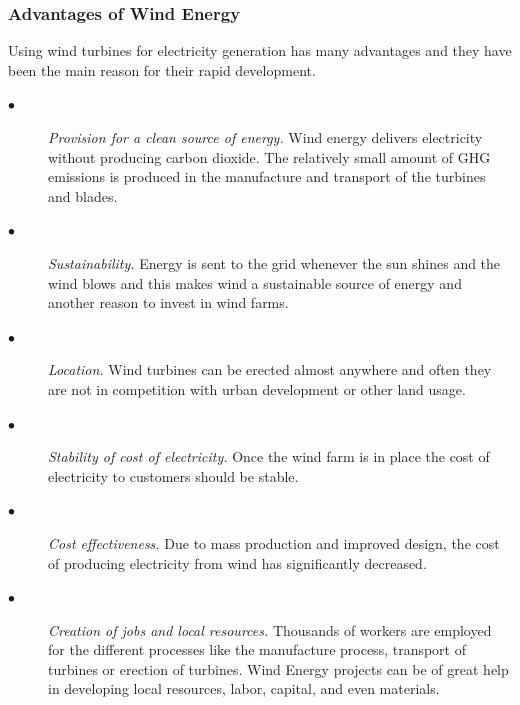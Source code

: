 \documentclass[twosided,a4,10pt]{article}
\begin{document}
\begin{multicols}{2}
 \subsubsection{Advantages of Wind Energy}
 Using wind turbines for electricity generation has many advantages and they have been the main reason for their rapid development.
 \begin{description}
 	\item[$\bullet$]
 	 \textit{Provision for a clean source of energy.} Wind energy delivers electricity without producing carbon dioxide. The relatively small amount of GHG emissions is produced in the manufacture and transport of the turbines and blades.
 	\item[$\bullet$] \textit{Sustainability.} Energy is sent to the grid whenever the sun shines and the wind blows and this makes wind a sustainable source of energy and another reason to invest in wind farms.
 	\item[$\bullet$] \textit{Location.} Wind turbines can be erected almost anywhere and often they are not in competition with urban development or other land usage.
 	\item[$\bullet$]
 	\textit{Stability of cost of electricity.} Once the wind farm is in place the cost of electricity to customers should be stable.
 	\item[$\bullet$]
 	\textit{Cost effectiveness.} Due to mass production and improved design, the cost of producing electricity from wind has significantly decreased.
 	\item[$\bullet$]
 	\textit{Creation of jobs and local resources.} Thousands of workers are employed for the different processes like the manufacture process, transport of turbines or erection of turbines. Wind Energy projects can be of great help in developing local resources, labor, capital, and even materials.
 \end{description}
 

\end{multicols}
\end{document}
